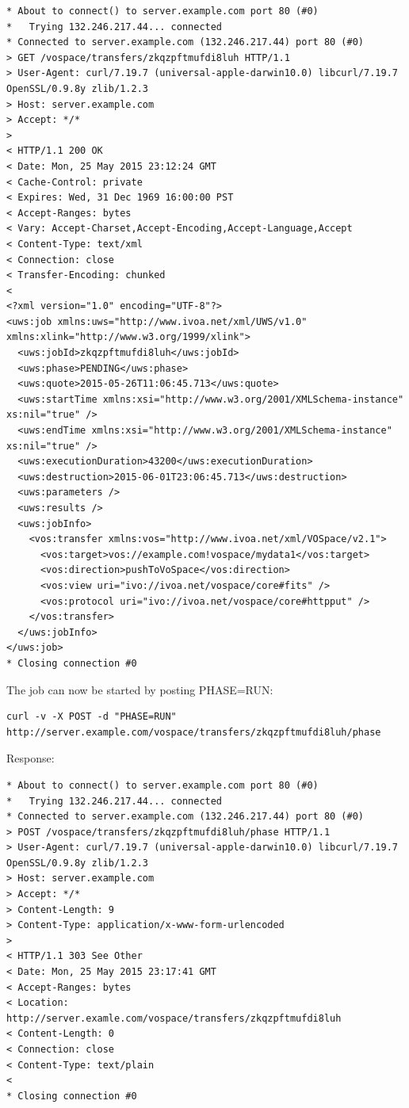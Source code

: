 \documentclass[11pt,a4paper]{ivoa}
\begin{document}
\begin{lstlisting}
* About to connect() to server.example.com port 80 (#0)
*   Trying 132.246.217.44... connected
* Connected to server.example.com (132.246.217.44) port 80 (#0)
> GET /vospace/transfers/zkqzpftmufdi8luh HTTP/1.1
> User-Agent: curl/7.19.7 (universal-apple-darwin10.0) libcurl/7.19.7 OpenSSL/0.9.8y zlib/1.2.3
> Host: server.example.com
> Accept: */*
>
< HTTP/1.1 200 OK
< Date: Mon, 25 May 2015 23:12:24 GMT
< Cache-Control: private
< Expires: Wed, 31 Dec 1969 16:00:00 PST
< Accept-Ranges: bytes
< Vary: Accept-Charset,Accept-Encoding,Accept-Language,Accept
< Content-Type: text/xml
< Connection: close
< Transfer-Encoding: chunked
<
<?xml version="1.0" encoding="UTF-8"?>
<uws:job xmlns:uws="http://www.ivoa.net/xml/UWS/v1.0" xmlns:xlink="http://www.w3.org/1999/xlink">
  <uws:jobId>zkqzpftmufdi8luh</uws:jobId>
  <uws:phase>PENDING</uws:phase>
  <uws:quote>2015-05-26T11:06:45.713</uws:quote>
  <uws:startTime xmlns:xsi="http://www.w3.org/2001/XMLSchema-instance" xs:nil="true" />
  <uws:endTime xmlns:xsi="http://www.w3.org/2001/XMLSchema-instance" xs:nil="true" />
  <uws:executionDuration>43200</uws:executionDuration>
  <uws:destruction>2015-06-01T23:06:45.713</uws:destruction>
  <uws:parameters />
  <uws:results />
  <uws:jobInfo>
    <vos:transfer xmlns:vos="http://www.ivoa.net/xml/VOSpace/v2.1">
      <vos:target>vos://example.com!vospace/mydata1</vos:target>
      <vos:direction>pushToVoSpace</vos:direction>
      <vos:view uri="ivo://ivoa.net/vospace/core#fits" />
      <vos:protocol uri="ivo://ivoa.net/vospace/core#httpput" />
    </vos:transfer>
  </uws:jobInfo>
</uws:job>
* Closing connection #0
\end{lstlisting}
The job can now be started by posting PHASE=RUN:
\begin{lstlisting}
curl -v -X POST -d "PHASE=RUN" http://server.example.com/vospace/transfers/zkqzpftmufdi8luh/phase
\end{lstlisting}
Response:
\begin{lstlisting}
* About to connect() to server.example.com port 80 (#0)
*   Trying 132.246.217.44... connected
* Connected to server.example.com (132.246.217.44) port 80 (#0)
> POST /vospace/transfers/zkqzpftmufdi8luh/phase HTTP/1.1
> User-Agent: curl/7.19.7 (universal-apple-darwin10.0) libcurl/7.19.7 OpenSSL/0.9.8y zlib/1.2.3
> Host: server.example.com
> Accept: */*
> Content-Length: 9
> Content-Type: application/x-www-form-urlencoded
>
< HTTP/1.1 303 See Other
< Date: Mon, 25 May 2015 23:17:41 GMT
< Accept-Ranges: bytes
< Location: http://server.examle.com/vospace/transfers/zkqzpftmufdi8luh
< Content-Length: 0
< Connection: close
< Content-Type: text/plain
<
* Closing connection #0
\end{lstlisting}
\end{document}
